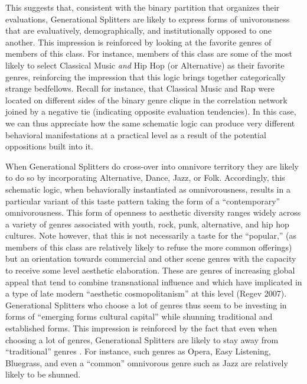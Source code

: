 \documentclass[preprint,12pt]{elsarticle}
\begin{document}
This suggests that, consistent with the binary partition that organizes their evaluations, Generational Splitters are likely to express forms of univorousness that are evaluatively, demographically, and institutionally opposed to one another. This impression is reinforced by looking at the favorite genres of members of this class. For instance, members of this class are some of the most likely to select Classical Music {\em and} Hip Hop (or Alternative) as their favorite genres, reinforcing the impression that this logic brings together categorically strange bedfellows. Recall for instance, that Classical Music and Rap were located on different sides of the binary genre clique in the correlation network joined by a negative tie (indicating opposite evaluation tendencies). In this case, we can thus appreciate how the same schematic logic can produce very different behavioral manifestations at a practical level as a result of the potential oppositions built into it. 

When Generational Splitters do cross-over into omnivore territory they are likely to do so by incorporating Alternative, Dance, Jazz, or Folk. Accordingly, this schematic logic, when behaviorally instantiated as omnivorousness, results in a particular variant of this taste pattern taking the form of a ``contemporary'' omnivorousness. This form of openness to aesthetic diversity ranges widely across a variety of genres associated with youth, rock, punk, alternative, and hip hop cultures. Note however, that this is not necessarily a taste for the ``popular,'' (as members of this class are relatively likely to refuse the more common offerings) but an orientation towards commercial and other scene genres with the capacity to receive some level aesthetic elaboration. These are genres of increasing global appeal that tend to combine transnational influence and which have implicated in a type of late modern ``aesthetic cosmopolitanism'' at this level (Regev 2007). Generational Splitters who choose a lot of genres thus seem to be investing in forms of ``emerging forms cultural capital'' while shunning traditional and established forms. This impression is reinforced by the fact that even when choosing a lot of genres, Generational Splitters are likely to stay away from ``traditional'' genres . For instance, such genres as Opera, Easy Listening, Bluegrass, and even a ``common'' omnivorous genre such as Jazz are relatively likely to be shunned.  
\end{document}
